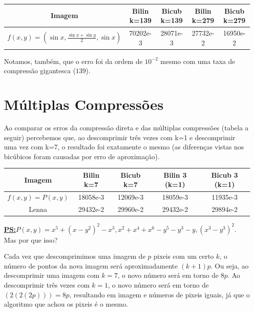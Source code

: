 \documentclass[12pt]{article}
\newcommand{\mytitle}[1]{\textbf{\underline{#1}}}
\begin{document}
\begin{center}
  \begin{tabular}{||c | c | c  | c | c||} 
    \hline
    Imagem & Bilin k=139 & Bicub k=139 & Bilin k=279 & Bicub k=279\\[0.5ex] 
    \hline\hline
    $f(x, y) = (\sin{x}, \frac{\sin{x}+\sin{y}}{2}, \sin{x})$ & 70202e-3 & 28071e-3 & 27732e-2 & 16950e-2 \\[1ex]
    \hline
  \end{tabular}
\end{center}

Notamos, também, que o erro foi da ordem de $10^{-2}$ mesmo com uma taxa de compressão gigantesca ($139$).

\newpage
\section{Múltiplas Compressões}
Ao comparar os erros da compressão direta e das múltiplas compressões (tabela a seguir) percebemos que, ao descomprimir três vezes com k=1 e descomprimir uma vez com k=7, o resultado foi exatamente o mesmo (as diferenças vistas nos bicúbicos foram causadas por erro de aproximação).

\begin{center}
  \begin{tabular}{||c | c | c  | c | c||} 
    \hline
    Imagem & Bilin k=7 & Bicub k=7 & Bilin 3 (k=1) & Bicub 3 (k=1)\\[0.5ex] 
    \hline\hline
    $f(x, y) = P(x, y)$ & 18058e-3 & 12069e-3 & 18059e-3 & 11935e-3 \\
    \hline
    Lenna & 29432e-2 & 29960e-2 & 29432e-2 & 29894e-2 \\[1ex]
    \hline    
  \end{tabular}
\end{center}

\mytitle{PS:}$P(x, y) = x^5 + (x - y^2)^2 - x^3, x^2 + x^4 + x^6 - y^5 - y^3 - y, (x^3 - y^3)^2$.
\\

Mas por que isso?

Cada vez que descomprimimos uma imagem de $p$ pixeis com um certo $k$, o número de pontos da nova imagem será aproximadamente $(k+1)p$. Ou seja, ao descomprimir uma imagem com $k=7$, o novo número será em torno de $8p$. Ao descomprimir três vezes com $k=1$, o novo número será em torno de $(2(2(2p))) = 8p$, resultando em imagem e números de pixeis iguais, já que o algoritmo que achou os pixeis é o mesmo.
\end{document}
